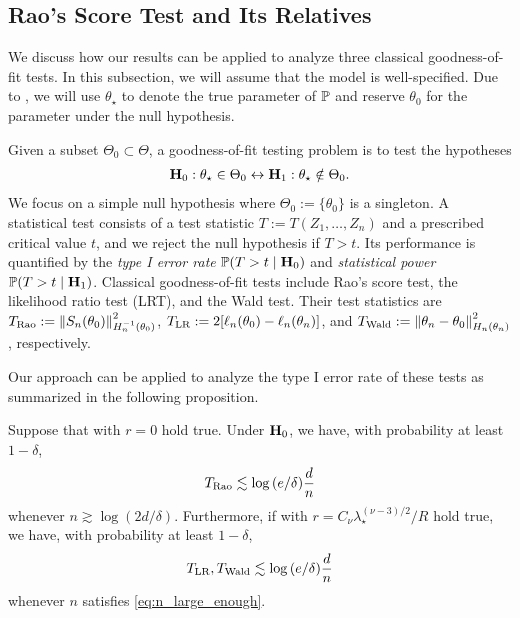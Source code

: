 \subsection{Rao's Score Test and Its Relatives}
\label{sub:goodness}

We discuss how our results can be applied to analyze three classical goodness-of-fit tests.
In this subsection, we will assume that the model is well-specified.
Due to , we will use $\theta_\star$ to denote the true parameter of $\operatorname{\mathbb P}$ and reserve $\theta_0$ for the parameter under the null hypothesis.

Given a subset $\Theta_0 \subset \Theta$, a goodness-of-fit testing problem is to test the hypotheses
\begin{align*}
    \mathbf{H}_0: \theta_\star \in \Theta_0 \leftrightarrow \mathbf{H}_1: \theta_\star \notin \Theta_0.
\end{align*}
We focus on a simple null hypothesis where $\Theta_0 := \{\theta_0\}$ is a singleton.
A statistical test consists of a test statistic $T := T(Z_1, \dots, Z_n)$ and a prescribed critical value $t$, and we reject the null hypothesis if $T > t$.
Its performance is quantified by the \emph{type I error rate} $\operatorname{\mathbb P}(T > t \mid \mathbf{H}_0)$ and \emph{statistical power} $\operatorname{\mathbb P}(T > t \mid \mathbf{H}_1)$.
Classical goodness-of-fit tests include Rao's score test, the likelihood ratio test (LRT), and the Wald test.
Their test statistics are $T_{\text{Rao}} := \left\lVert S_n(\theta_0) \right\rVert_{H_n^{-1}(\theta_0)}^2$, $T_{\text{LR}} := 2[\ell_n(\theta_0) - \ell_n(\theta_n)]$, and $T_{\text{Wald}} := \left\lVert \theta_n - \theta_0 \right\rVert_{H_n(\theta_n)}^2$,
respectively.

Our approach can be applied to analyze the type I error rate of these tests as summarized in the following proposition.
\begin{proposition}\label{prop:typeI}
    Suppose that  with $r = 0$ hold true.
    Under $\mathbf{H}_0$, we have, with probability at least $1 - \delta$,
    \begin{align*}
        T_{\text{Rao}} \lesssim \log{(e/\delta)} \frac{d}n
    \end{align*}
    whenever $n \gtrsim \log{(2d/\delta)}$.
    Furthermore, if  with $r = C_\nu \lambda_\star^{(\nu-3)/2}/R$ hold true, we have, with probability at least $1 - \delta$,
    \begin{align*}
        T_{\text{LR}}, T_{\text{Wald}} \lesssim \log{(e/\delta)} \frac{d}{n}
    \end{align*}
    whenever $n$ satisfies \eqref{eq:n_large_enough}.
\end{proposition}

